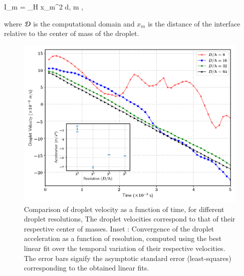 \be
I_m = \int_\DDD H x_m^2 {\rm d}\X \;,  \le m ,
\nd

where ${\cal D}$ is the computational domain and $x_m$ is the distance of the interface relative to the center of mass of the droplet.   

\begin{figure}[h!]
\begin{center}
\includegraphics[scale = 0.5]{Figures/Sagar/dropl_velocity_accel_ppd.png}
\end{center}
\vspace*{-0.5cm}
\caption{Comparison of droplet velocity as a function of time, for different droplet resolutions, The droplet velocities correspond to that of their respective center of masses. Inset : Convergence of the droplet acceleration as a function of resolution, computed using the best linear fit over the temporal variation of their respective velocities. The error bars signify the asymptotic standard error (least-squares) corresponding to the obtained linear fits.} 
\label{drop_vel}
\end{figure}

